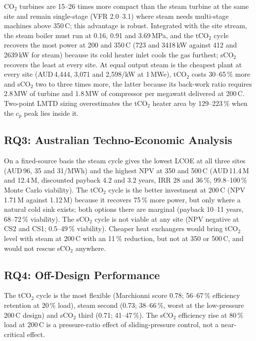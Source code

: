 \documentclass[12pt,a4paper]{report}
\begin{document}
CO$_2$ turbines are 15--26 times more compact than the steam turbine at the
same site and remain single-stage (VFR 2.0--3.1) where steam needs
multi-stage machines above 350\,\textdegree C; this advantage is robust.
Integrated with the site stream, the steam boiler must run at 0.16, 0.91 and
3.69\,MPa, and the tCO$_2$ cycle recovers the most power at 200 and
350\,\textdegree C (723 and 3418\,kW against 412 and 2639\,kW for steam)
because its cold heater inlet cools the gas furthest; sCO$_2$ recovers the
least at every site. At equal output steam is the cheapest plant at every
site (AUD\,4{,}444, 3{,}071 and 2{,}598/kW at 1\,MWe), tCO$_2$ costs 30--65\,\%
more and sCO$_2$ two to three times more, the latter because its back-work
ratio requires 2.8\,MW of turbine and 1.8\,MW of compressor per megawatt
delivered at 200\,\textdegree C. Two-point LMTD sizing overestimates the
tCO$_2$ heater area by 129--223\,\% when the $c_p$ peak lies inside it.

\subsection{RQ3: Australian Techno-Economic Analysis}

On a fixed-source basis the steam cycle gives the lowest LCOE at all three
sites (AUD\,96, 35 and 31/MWh) and the highest NPV at 350 and
500\,\textdegree C (AUD\,11.4\,M and 12.4\,M, discounted payback 4.2 and
3.2 years, IRR 28 and 36\,\%, 99.8--100\,\% Monte Carlo viability). The
tCO$_2$ cycle is the better investment at 200\,\textdegree C (NPV 1.71\,M
against 1.12\,M) because it recovers 75\,\% more power, but only where a
natural cold sink exists; both options there are marginal (payback 10--11
years, 68--72\,\% viability). The sCO$_2$ cycle is not viable at any site
(NPV negative at CS2 and CS1; 0.5--49\,\% viability). Cheaper heat exchangers
would bring tCO$_2$ level with steam at 200\,\textdegree C with an 11\,\%
reduction, but not at 350 or 500\,\textdegree C, and would not rescue sCO$_2$
anywhere.

\subsection{RQ4: Off-Design Performance}

The tCO$_2$ cycle is the most flexible (Marchionni score 0.78; 56--67\,\%
efficiency retention at 20\,\% load), steam second (0.73; 38--66\,\%, worst
at the low-pressure 200\,\textdegree C design) and sCO$_2$ third (0.71;
41--47\,\%). The sCO$_2$ efficiency rise at 80\,\% load at 200\,\textdegree C
is a pressure-ratio effect of sliding-pressure control, not a near-critical
effect.
\end{document}

